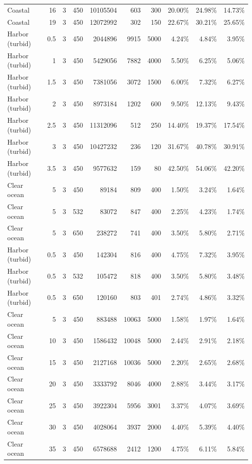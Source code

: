\begin{tabular}{l r c c r r r r r r}
Coastal & 16 & 3 & 450 & 10105504 & 603 & 300 & 20.00\% & 24.98\% & 14.73\% \\
Coastal & 19 & 3 & 450 & 12072992 & 302 & 150 & 22.67\% & 30.21\% & 25.65\% \\
Harbor (turbid) & 0.5 & 3 & 450 & 2044896 & 9915 & 5000 & 4.24\% & 4.84\% & 3.95\% \\
Harbor (turbid) & 1 & 3 & 450 & 5429056 & 7882 & 4000 & 5.50\% & 6.25\% & 5.06\% \\
Harbor (turbid) & 1.5 & 3 & 450 & 7381056 & 3072 & 1500 & 6.00\% & 7.32\% & 6.27\% \\
Harbor (turbid) & 2 & 3 & 450 & 8973184 & 1202 & 600 & 9.50\% & 12.13\% & 9.43\% \\
Harbor (turbid) & 2.5 & 3 & 450 & 11312096 & 512 & 250 & 14.40\% & 19.37\% & 17.54\% \\
Harbor (turbid) & 3 & 3 & 450 & 10427232 & 236 & 120 & 31.67\% & 40.78\% & 30.91\% \\
Harbor (turbid) & 3.5 & 3 & 450 & 9577632 & 159 & 80 & 42.50\% & 54.06\% & 42.20\% \\
Clear ocean & 5 & 3 & 450 & 89184 & 809 & 400 & 1.50\% & 3.24\% & 1.64\% \\
Clear ocean & 5 & 3 & 532 & 83072 & 847 & 400 & 2.25\% & 4.23\% & 1.74\% \\
Clear ocean & 5 & 3 & 650 & 238272 & 741 & 400 & 3.50\% & 5.80\% & 2.71\% \\
Harbor (turbid) & 0.5 & 3 & 450 & 142304 & 816 & 400 & 4.75\% & 7.32\% & 3.95\% \\
Harbor (turbid) & 0.5 & 3 & 532 & 105472 & 818 & 400 & 3.50\% & 5.80\% & 3.48\% \\
Harbor (turbid) & 0.5 & 3 & 650 & 120160 & 803 & 401 & 2.74\% & 4.86\% & 3.32\% \\
Clear ocean & 5 & 3 & 450 & 883488 & 10063 & 5000 & 1.58\% & 1.97\% & 1.64\% \\
Clear ocean & 10 & 3 & 450 & 1586432 & 10048 & 5000 & 2.44\% & 2.91\% & 2.18\% \\
Clear ocean & 15 & 3 & 450 & 2127168 & 10036 & 5000 & 2.20\% & 2.65\% & 2.68\% \\
Clear ocean & 20 & 3 & 450 & 3333792 & 8046 & 4000 & 2.88\% & 3.44\% & 3.17\% \\
Clear ocean & 25 & 3 & 450 & 3922304 & 5956 & 3001 & 3.37\% & 4.07\% & 3.69\% \\
Clear ocean & 30 & 3 & 450 & 4028064 & 3937 & 2000 & 4.40\% & 5.39\% & 4.40\% \\
Clear ocean & 35 & 3 & 450 & 6578688 & 2412 & 1200 & 4.75\% & 6.11\% & 5.84\% \\

\end{tabular}
